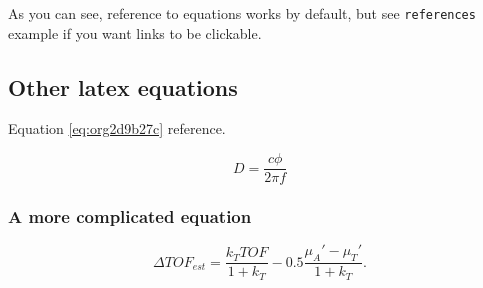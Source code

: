 As you can see, reference to equations works by default, but see \texttt{references}
example if you want links to be clickable.

\subsection{Other latex equations}
\label{sec:org0cd0f7e}
Equation \ref{eq:org2d9b27c} reference.

\begin{equation}
\label{eq:org2d9b27c}
D = \frac{c\phi}{2\pi f}
\end{equation}

\subsubsection{A more complicated equation}
\label{sec:org28b9295}

\begin{equation}
\Delta TOF_{est} = \frac{k_T TOF}{1+k_T } - 0.5 \frac{\mu_A' - \mu_T'}{1+k_T}.
\end{equation}


